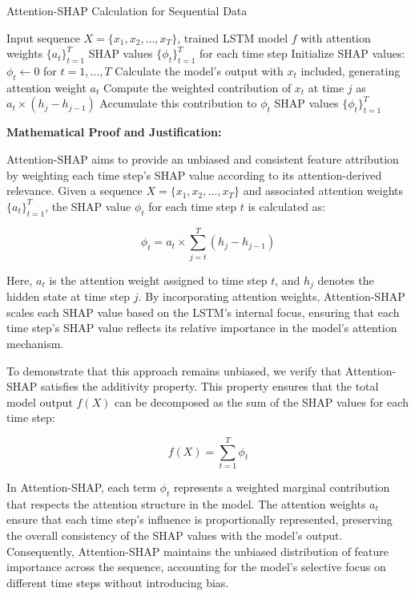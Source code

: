 \begin{algorithm}
\caption{Attention-SHAP Calculation for Sequential Data}
\begin{algorithmic}[1]
\Require Input sequence $X = \{x_1, x_2, \ldots, x_T\}$, trained LSTM model $f$ with attention weights $\{a_t\}_{t=1}^T$
\Ensure SHAP values $\{\phi_t\}_{t=1}^T$ for each time step
\State Initialize SHAP values: $\phi_t \gets 0$ for $t = 1, \ldots, T$
    \State Calculate the model’s output with $x_t$ included, generating attention weight $a_t$
        \State Compute the weighted contribution of $x_t$ at time $j$ as $a_t \times \left( h_j - h_{j-1} \right)$
        \State Accumulate this contribution to $\phi_t$
    \EndFor
\EndFor
\State \Return SHAP values $\{\phi_t\}_{t=1}^T$
\end{algorithmic}
\end{algorithm}

\textbf{Mathematical Proof and Justification:}

Attention-SHAP aims to provide an unbiased and consistent feature attribution by weighting each time step’s SHAP value according to its attention-derived relevance. Given a sequence \( X = \{x_1, x_2, \ldots, x_T\} \) and associated attention weights \( \{a_t\}_{t=1}^T \), the SHAP value \( \phi_t \) for each time step \( t \) is calculated as:

\[
\phi_t = a_t \times \sum_{j=t}^{T} \left( h_j - h_{j-1} \right)
\]

Here, \( a_t \) is the attention weight assigned to time step \( t \), and \( h_j \) denotes the hidden state at time step \( j \). By incorporating attention weights, Attention-SHAP scales each SHAP value based on the LSTM’s internal focus, ensuring that each time step’s SHAP value reflects its relative importance in the model’s attention mechanism.

To demonstrate that this approach remains unbiased, we verify that Attention-SHAP satisfies the additivity property. This property ensures that the total model output \( f(X) \) can be decomposed as the sum of the SHAP values for each time step:

\[
f(X) = \sum_{t=1}^{T} \phi_t
\]

In Attention-SHAP, each term \( \phi_t \) represents a weighted marginal contribution that respects the attention structure in the model. The attention weights \( a_t \) ensure that each time step’s influence is proportionally represented, preserving the overall consistency of the SHAP values with the model’s output. Consequently, Attention-SHAP maintains the unbiased distribution of feature importance across the sequence, accounting for the model’s selective focus on different time steps without introducing bias.

